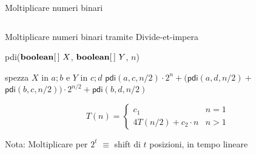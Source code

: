 \begin{frame}{Moltiplicare numeri binari}
\begin{myboxtitle}
\begin{columns}[c]
\begin{column}{0.46\textwidth}
\begin{center}
\end{center}
\end{column}
\end{columns}
\end{myboxtitle}


\end{frame}

\begin{frame}{Moltiplicare numeri binari tramite Divide-et-impera}
    
\vspace{-9pt}
\begin{Procedure}
\caption[A]{\BOOLEAN[\,] \textsf{pdi}($\BOOLEAN[\,]\ X$, $\BOOLEAN[\,]\ Y$, \INTEGER $n$)}
{
  spezza $X$ in $a;b$ e $Y$ in $c;d$\;
  \Return $\textsf{pdi}(a,c, n/2)\cdot 2^n + (\textsf{pdi}(a,d, n/2)+$\; 
  \hspace{1.2cm} $\textsf{pdi}(b,c, n/2)) \cdot 2^{n/2} + \textsf{pdi}(b,d, n/2)$\;
}
\end{Procedure}
\[
T(n) = \left\{ 
  \begin{array}{ll}
     c_1 & n = 1\\
     4 T(n/2) + c_2 \cdot n & n > 1 
  \end{array} 
\right.
\]


\begin{mybox}
\alert{Nota}:
 Moltiplicare per $2^t$ $\equiv$ shift di $t$ posizioni, in tempo lineare
\end{mybox}

	
\end{frame}

